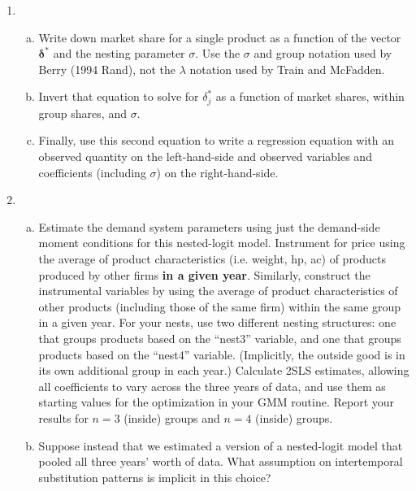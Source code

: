 \documentclass[12pt]{article}
\newcounter{mycounter} %
\begin{document}
\begin{enumerate}
\setcounter{enumi}{\value{mycounter}}
\item
    \begin{enumerate}[(a)]
    \item Write down market share for a single product as a function of the vector \(\symbf{\delta}^*\) and the nesting parameter \(\sigma\). Use the \(\sigma\) and group notation used by Berry (1994 Rand), not the \(\lambda\) notation used by Train and McFadden.
    \item Invert that equation to solve for \(\delta_{j}^*\) as a function of market shares, within group shares, and \(\sigma\).
    \item Finally, use this second equation to write a regression equation with an observed quantity on the left-hand-side and observed variables and coefficients (including \(\sigma\)) on the right-hand-side.
    \end{enumerate}
\item \begin{enumerate}[(a)]
    \item Estimate the demand system parameters using just the demand-side moment conditions for this nested-logit model. 
        Instrument for price using the average of product characteristics (i.e. weight, hp, ac) of products produced by other firms \textbf{in a given year}. Similarly, construct the instrumental variables by using the average of product characteristics of other products (including those of the same firm) within the same group in a given year. For your nests, use two different nesting structures: one that groups products based on the ``nest3'' variable, and one that groups products based on the ``nest4'' variable. (Implicitly, the outside good is in its own additional group in each year.) 
Calculate 2SLS estimates, allowing all coefficients to vary across the three years of data, and use them as starting values for the optimization in your GMM routine. Report your results for $n=3$ (inside) groups and \(n=4\) (inside) groups.
    \item Suppose instead that we estimated a version of a nested-logit model that pooled all three years' worth of data. What assumption on intertemporal substitution patterns is implicit in this choice?

\end{enumerate}
\end{enumerate}
\end{document}
